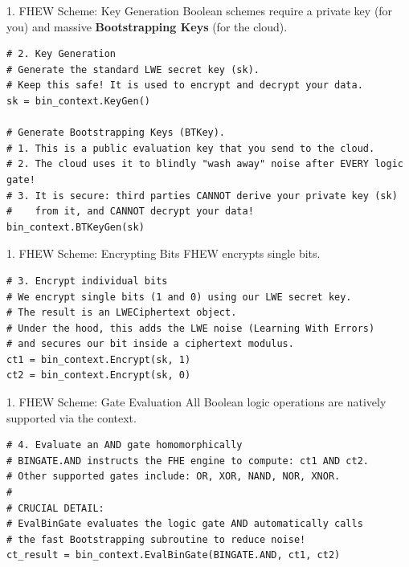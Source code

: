 \documentclass[aspectratio=169, 10pt]{beamer}
\begin{document}
\begin{frame}[fragile]{1. FHEW Scheme: Key Generation}
Boolean schemes require a private key (for you) and massive \textbf{Bootstrapping Keys} (for the cloud).
\vspace{0.2cm}
\begin{lstlisting}[firstnumber=14]
# 2. Key Generation
# Generate the standard LWE secret key (sk). 
# Keep this safe! It is used to encrypt and decrypt your data.
sk = bin_context.KeyGen()

# Generate Bootstrapping Keys (BTKey).
# 1. This is a public evaluation key that you send to the cloud.
# 2. The cloud uses it to blindly "wash away" noise after EVERY logic gate!
# 3. It is secure: third parties CANNOT derive your private key (sk) 
#    from it, and CANNOT decrypt your data!
bin_context.BTKeyGen(sk)
\end{lstlisting}
\end{frame}

\begin{frame}[fragile]{1. FHEW Scheme: Encrypting Bits}
FHEW encrypts single bits.
\vspace{0.2cm}
\begin{lstlisting}[firstnumber=24]
# 3. Encrypt individual bits
# We encrypt single bits (1 and 0) using our LWE secret key.
# The result is an LWECiphertext object.
# Under the hood, this adds the LWE noise (Learning With Errors) 
# and secures our bit inside a ciphertext modulus.
ct1 = bin_context.Encrypt(sk, 1)
ct2 = bin_context.Encrypt(sk, 0)
\end{lstlisting}
\end{frame}

\begin{frame}[fragile]{1. FHEW Scheme: Gate Evaluation}
All Boolean logic operations are natively supported via the context.
\vspace{0.2cm}
\begin{lstlisting}[firstnumber=32]
# 4. Evaluate an AND gate homomorphically
# BINGATE.AND instructs the FHE engine to compute: ct1 AND ct2.
# Other supported gates include: OR, XOR, NAND, NOR, XNOR.
#
# CRUCIAL DETAIL: 
# EvalBinGate evaluates the logic gate AND automatically calls 
# the fast Bootstrapping subroutine to reduce noise!
ct_result = bin_context.EvalBinGate(BINGATE.AND, ct1, ct2)
\end{lstlisting}
\end{frame}
\end{document}
